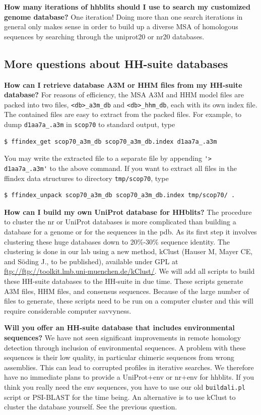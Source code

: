 \documentclass[11pt,a4paper]{article}
\begin{document}
{\bf How many iterations of hhblits should I use to search my customized genome database?} One iteration! Doing more than one search iterations in general only makes sense in order to build up a diverse MSA of homologous sequences by searching through the uniprot20 or nr20 databases. 



\subsection{More questions about HH-suite databases}


{\bf How can I retrieve database A3M or HHM files from my HH-suite database?}
For reasons of efficiency, the MSA A3M and HHM model files are packed into two files, \verb`<db>_a3m_db` and \verb`<db>_hhm_db`, each with its own index file. The contained files are easy to extract from the packed files. For example, to dump \verb`d1aa7a_.a3m` in \verb`scop70` to standard output, type 
\begin{verbatim}
$ ffindex_get scop70_a3m_db scop70_a3m_db.index d1aa7a_.a3m
\end{verbatim}
You may write the extracted file to a separate file by appending \verb`'> d1aa7a_.a3m'` to the above command.
If you want to extract all files in the ffindex data structures to directory \verb`tmp/scop70`, type
\begin{verbatim}
$ ffindex_unpack scop70_a3m_db scop70_a3m_db.index tmp/scop70/ .
\end{verbatim}


{\bf How can I build my own UniProt database for HHblits?}
The procedure to cluster the nr or UniProt databases is more complicated than building a database for a genome or for the sequences in the pdb. As its first step it involves clustering these huge databases down to 20\%-30\% sequence identity. The clustering is done in our lab using a new method, kClust (Hauser M, Mayer CE, and S\"oding J., to be published), available under GPL at \url{ftp://ftp://toolkit.lmb.uni-muenchen.de/kClust/}. We will add all scripts to build these HH-suite databases to the HH-suite in due time. These scripts generate A3M files, HHM files, and consensus sequences. Because of the large number of files to generate, these scripts need to be run on a computer cluster and this will require considerable computer savvyness. 

{\bf Will you offer an HH-suite database that includes environmental sequences?}
We have not seen significant improvements in remote homology detection through inclusion of environmental sequences. A problem with these sequences is their low quality, in particular chimeric sequences from wrong assemblies. This can lead to corrupted profiles in iterative searches. We therefore have no immediate plans to provide a UniProt+env or nr+env for hhblits. If you think you really need the env sequences, you have to use our old \verb`buildali.pl` script or PSI-BLAST for the time being. An alternative is to use kClust to cluster the database yourself. See the previous question.
\end{document}
